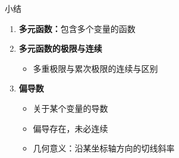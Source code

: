 \begin{frame}[<+->]{小结}
	\linespread{1.5}
	\begin{enumerate}
	  \item {\bf 多元函数：}包含多个变量的函数
	  \item {\bf 多元函数的极限与连续}
	  \begin{itemize}
	    \item 多重极限与累次极限的连续与区别
	  \end{itemize}
	  \item {\bf 偏导数}
	  \begin{itemize}
	    \item 关于某个变量的导数
	    \item 偏导存在，未必连续
	    \item 几何意义：沿某坐标轴方向的切线斜率
	  \end{itemize}
	\end{enumerate}
\end{frame}

